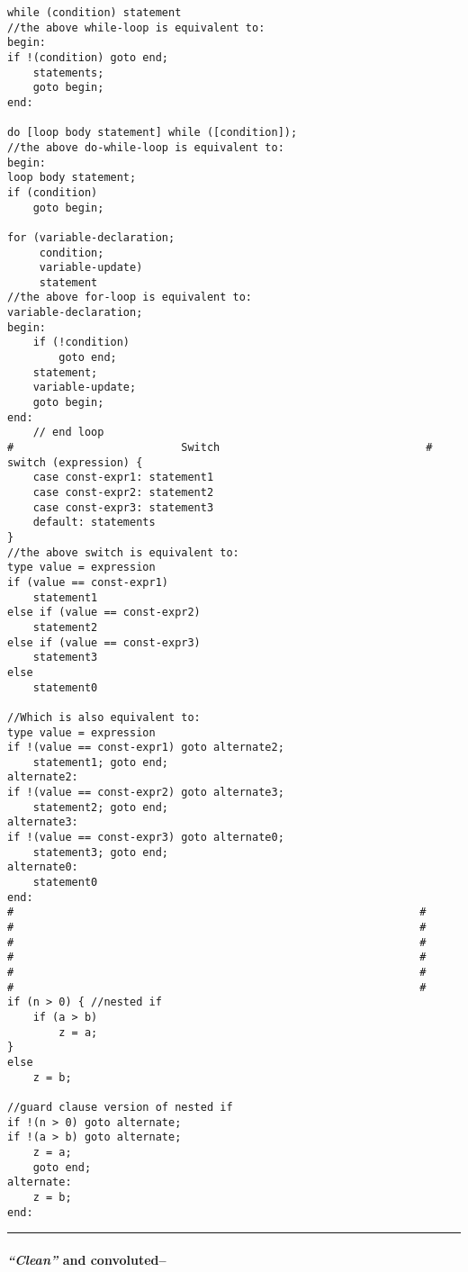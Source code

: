 \begin{verbatim}
while (condition) statement
//the above while-loop is equivalent to:
begin:
if !(condition) goto end;
    statements;
    goto begin;
end:

do [loop body statement] while ([condition]);
//the above do-while-loop is equivalent to:
begin:
loop body statement;
if (condition)
    goto begin;

for (variable-declaration;
     condition;
     variable-update)
     statement
//the above for-loop is equivalent to:
variable-declaration;
begin:
    if (!condition)
        goto end;
    statement;
    variable-update;
    goto begin;
end:
    // end loop 
#                          Switch                                #
switch (expression) {
    case const-expr1: statement1
    case const-expr2: statement2
    case const-expr3: statement3
    default: statements
}
//the above switch is equivalent to:
type value = expression
if (value == const-expr1)
    statement1
else if (value == const-expr2)
    statement2
else if (value == const-expr3)
    statement3
else
    statement0

//Which is also equivalent to:
type value = expression
if !(value == const-expr1) goto alternate2;
    statement1; goto end;
alternate2:
if !(value == const-expr2) goto alternate3;
    statement2; goto end;
alternate3:
if !(value == const-expr3) goto alternate0;
    statement3; goto end;
alternate0:
    statement0
end:
#                                                               #
#                                                               #
#                                                               #
#                                                               #
#                                                               #
#                                                               #
if (n > 0) { //nested if
    if (a > b)
        z = a;
}
else
    z = b;

//guard clause version of nested if
if !(n > 0) goto alternate;
if !(a > b) goto alternate;
    z = a;
    goto end;
alternate:
    z = b;
end:
\end{verbatim}

\begin{center}\rule{0.5\linewidth}{0.5pt}\end{center}

\hypertarget{clean-and-convoluted}{%
\paragraph{\texorpdfstring{\emph{``Clean''} and
convoluted--}{``Clean'' and convoluted--}}\label{clean-and-convoluted}}

